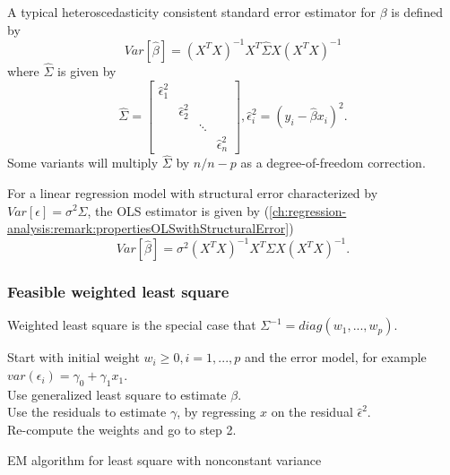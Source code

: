 \begin{refsection}
\begin{definition}
A typical heteroscedasticity consistent standard error estimator for $\beta$ is defined by	
	$$Var[\hat{\beta}] = (X^TX)^{-1}X^T\hat{\Sigma}X(X^TX)^{-1}$$
where $\hat{\Sigma}$ is given by
$$\hat{\Sigma} = \begin{bmatrix}
\hat{\epsilon}_1^2 &  &  & \\ 
& \hat{\epsilon}_2^2 &  & \\ 
&  & \ddots & \\ 
&  &  & \hat{\epsilon}_n^2
\end{bmatrix}, \hat{\epsilon}_i^2 = (y_i - \hat{\beta}x_i)^2.$$
Some variants will multiply $\hat{\Sigma}$ by $n/n-p$ as a degree-of-freedom correction.  
\end{definition}

\begin{remark}
For a linear regression model with structural error characterized by $Var[\epsilon] = \sigma^2 \Sigma$, the OLS estimator is given by (\autoref{ch:regression-analysis:remark:propertiesOLSwithStructuralError})	
	$$Var[\hat{\beta}] = \sigma^2 (X^TX)^{-1}X^T\Sigma X(X^TX)^{-1}.$$
\end{remark}



\subsubsection{Feasible weighted least square}

\begin{remark}
	Weighted least square is the special case that $\Sigma^{-1}=diag(w_1,...,w_p)$.
\end{remark}



\begin{algorithm}[H]
	\SetAlgoLined
	Start with initial weight $w_i\geq 0,i=1,...,p$ and the error model, for example $var(\epsilon_i) = \gamma_0 + \gamma_1x_1$.\\
	Use generalized least square to estimate $\beta$.\\
	Use the residuals to estimate $\gamma$, by regressing $x$ on the residual $\hat{\epsilon}^2$.\\
	Re-compute the weights and go to step 2.\\
	\caption{EM algorithm for least square with nonconstant variance}
\end{algorithm}



\end{refsection}
